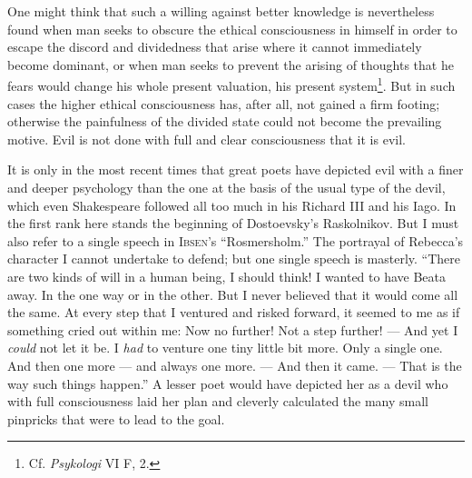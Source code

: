 \documentclass[12pt,a4paper,openany]{book}
\newcommand{\opage}[1]{\marginnote{\footnotesize\textit{[#1]}}}
\begin{document}
One might think that such a willing against better knowledge is nevertheless found when man seeks to
obscure the ethical consciousness in himself in order to escape the discord and dividedness that arise
where it cannot immediately become dominant, or when man seeks to prevent the arising of thoughts that he
fears would change his whole present valuation, his present system\footnote[1]{Cf. \textit{Psykologi} VI F,
2.}. But in such cases the higher ethical consciousness has, after all, not gained a firm footing;
otherwise the painfulness of the divided state could not become the prevailing motive. Evil is not done
with full and clear consciousness that it is evil.

It is only in the most recent times that great poets have depicted evil with a finer and deeper psychology
than the one at the basis of the usual type of the devil, which even Shakespeare followed all too much in
his Richard III and his Iago. In the first rank here stands the beginning of Dostoevsky's Raskolnikov. But
I must also refer to a single speech in \textsc{Ibsen}'s ``Rosmersholm.'' The portrayal of Rebecca's
character I cannot undertake to defend; but one single speech is masterly. ``There are two kinds of will
in a human being, I should think! I wanted to have Beata away. In the one way or in the other. But I never
believed that it would come all the same. At every step that I ventured and risked forward, it seemed to
me as if something cried out within me: Now no further! Not a step further! --- And yet I \textit{could}
not let it be. I \textit{had} to venture one tiny little bit more. Only a single one. And then one more ---
and always one more. --- And then it came. --- That is
\opage{134}the way such things happen.'' A lesser poet would have depicted her as a devil who with full
consciousness laid her plan and cleverly calculated the many small pinpricks that were to lead to the goal.
\end{document}
